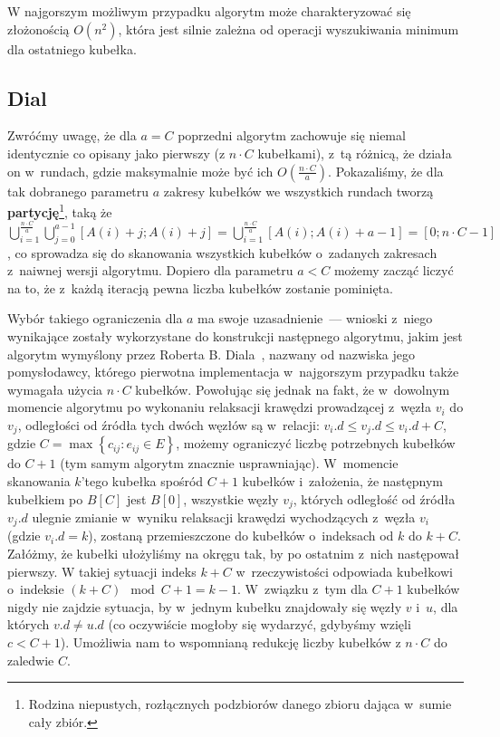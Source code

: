 W najgorszym możliwym przypadku algorytm może charakteryzować się złożonością $ O \left( n^{2} \right)$, która jest silnie zależna od operacji wyszukiwania minimum dla ostatniego kubełka.\label{DKMComplexity}



\subsection{Dial}



Zwróćmy uwagę, że dla $a=C$ poprzedni algorytm zachowuje się niemal identycznie co opisany jako pierwszy (z $n \cdot C$ kubełkami), z~tą różnicą, że działa on w~rundach, gdzie maksymalnie może być ich $O \left( \frac{n \cdot C}{a} \right)$.
Pokazaliśmy, że dla tak dobranego parametru $a$ zakresy kubełków we wszystkich rundach tworzą \textbf{partycję}\footnote{
	Rodzina niepustych, rozłącznych podzbiorów danego zbioru dająca w~sumie cały zbiór.
}, taką że $\bigcup _{i=1}^{\frac{n \cdot C}{a}} \bigcup _{j=0}^{a-1} \left[ A \left( i \right ) + j ; A \left( i \right ) + j \right ] = \bigcup _{i=1}^{\frac{n \cdot C}{a}} \left[ A \left( i \right ) ; A \left( i \right ) + a - 1 \right ] = \left[ 0 ; n \cdot C - 1 \right ]$, co sprowadza się do skanowania wszystkich kubełków o~zadanych zakresach z~naiwnej wersji algorytmu.
Dopiero dla parametru $a < C$ możemy zacząć liczyć na to, że z~każdą iteracją pewna liczba kubełków zostanie pominięta. 

Wybór takiego ograniczenia dla $a$ ma swoje uzasadnienie~--- wnioski z~niego wynikające zostały wykorzystane do konstrukcji następnego algorytmu, jakim jest algorytm wymyślony przez Roberta B. Diala~\cite[$4.6$]{Ahuja:1993:NFT:137406}, nazwany od nazwiska jego pomysłodawcy, którego pierwotna implementacja w~najgorszym przypadku także wymagała użycia $n \cdot C$ kubełków.
Powołując się jednak na fakt, że w~dowolnym momencie algorytmu po wykonaniu relaksacji krawędzi prowadzącej z~węzła $v_{i}$ do $v_{j}$, odległości od źródła tych dwóch węzłów są w~relacji: $v_{i}.d \leqslant v_{j}.d \leqslant v_{i}.d + C$, gdzie $C = \max \left\{ c_{ij} : e_{ij} \in E \right\}$, możemy ograniczyć liczbę potrzebnych kubełków do $C+1$ (tym samym algorytm znacznie usprawniając).
W~momencie skanowania $k$'tego kubełka spośród $C + 1$ kubełków i~założenia, że następnym kubełkiem po $B \left[ C \right]$ jest $B \left[ 0 \right]$, wszystkie węzły $v_{j}$, których odległość od źródła $v_{j}.d$ ulegnie zmianie w~wyniku relaksacji krawędzi wychodzących z~węzła $v_{i}$ (gdzie $v_{i}.d = k$), zostaną przemieszczone do kubełków o~indeksach od $k$ do $k + C$.
Załóżmy, że kubełki ułożyliśmy na okręgu tak, by po ostatnim z~nich następował pierwszy. W takiej sytuacji indeks $k + C$ w~rzeczywistości odpowiada kubełkowi o~indeksie $\left( k + C \right) \mod{C+1} = k - 1$.
W~związku z~tym dla $C+1$ kubełków nigdy nie zajdzie sytuacja, by w~jednym kubełku znajdowały się węzły $v$ i~$u$, dla których $v.d \neq u.d$ (co oczywiście mogłoby się wydarzyć, gdybyśmy wzięli $c < C + 1$). Umożliwia nam to wspomnianą redukcję liczby kubełków z $n \cdot C$ do zaledwie $C$.

